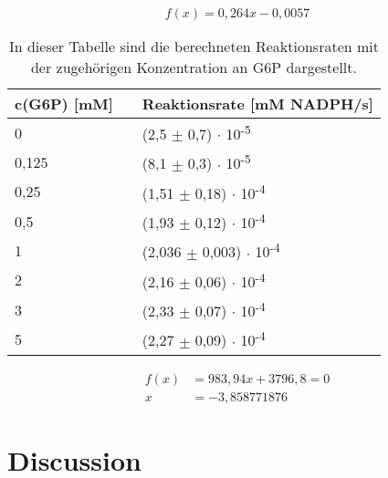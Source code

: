 \documentclass[a4paper,12pt]{report}
\begin{document}
{%


\begin{equation*}
	f(x) = 0,264x - 0,0057
\end{equation*}

\begin{table}[h!]
	\centering
	\caption [Reaktionsraten]{In dieser Tabelle sind die berechneten Reaktionsraten mit der zugehörigen Konzentration an G6P dargestellt.\label{TabelleReaktionsraten}}
	
	\begin{tabular}{lp{1.5cm}l}
		\toprule
		c(G6P) [mM]	& &	Reaktionsrate [mM NADPH/s]	\\
		
		\midrule
		0	& &	(2,5 $\pm$ 0,7) $\cdot$ 10\textsuperscript{-5}	\\
		0,125	& &	(8,1 $\pm$ 0,3) $\cdot$ 10\textsuperscript{-5}	\\
		0,25	& &	(1,51 $\pm$ 0,18) $\cdot$ 10\textsuperscript{-4}	\\
		0,5	& &	(1,93 $\pm$ 0,12) $\cdot$ 10\textsuperscript{-4}	\\
		1	& &	(2,036 $\pm$ 0,003) $\cdot$ 10\textsuperscript{-4}	\\
		2	& &	(2,16 $\pm$ 0,06) $\cdot$ 10\textsuperscript{-4}	\\
		3	& &	(2,33 $\pm$ 0,07) $\cdot$ 10\textsuperscript{-4}	\\
		5	& &	(2,27 $\pm$ 0,09) $\cdot$ 10\textsuperscript{-4}	\\
		
		\bottomrule
	\end{tabular}
\end{table}


\FloatBarrier



		
\begin{align*}
f(x) &= 983,94x + 3796,8 = 0 \\
x &= -3,858771876
\end{align*}


\chapter{Discussion}

}
\end{document}
